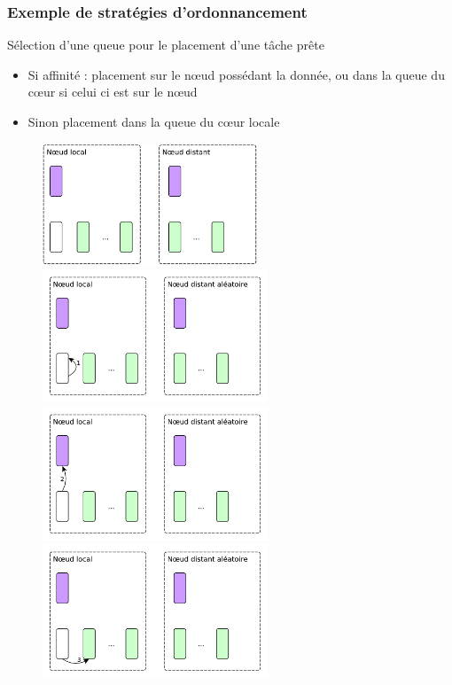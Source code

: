 \documentclass[xcolor={usenames,dvipsnames,svgnames,table}, aspectratio=43]{beamer}
\begin{document}
\begin{frame}
\frametitle{Exemple de stratégies d'ordonnancement}

\vspace{0.3cm}
Sélection d'une queue pour le placement d'une tâche prête
\begin{itemize}
  \item Si affinité : placement sur le nœud possédant la donnée, ou dans la queue du cœur si celui ci est sur le nœud
  \item Sinon placement dans la queue du cœur locale
\end{itemize}
\vspace{0.5cm}

\begin{figure}
   {%
    \includegraphics[width=0.57\textwidth]{graph/push_strategy.pdf}%
  }%
   {%
    \includegraphics[width=0.6\textwidth]{graph/steal_strategies_anim_1.pdf}%
  }%
   {%
    \includegraphics[width=0.6\textwidth]{graph/steal_strategies_anim_2.pdf}%
  }%
   {%
    \includegraphics[width=0.6\textwidth]{graph/steal_strategies_anim_3.pdf}%
}
\end{figure}
\end{frame}
\end{document}
